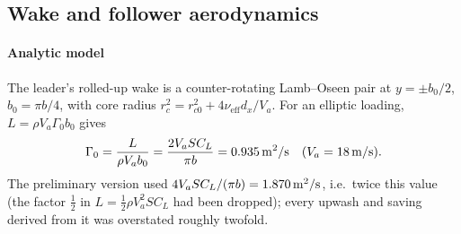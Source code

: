 \documentclass[preprint,12pt]{elsarticle}
\newcommand{\Va}{V_a}
\begin{document}
\begin{table}[H]
\centering\small
\caption{Parameters. M: from the preliminary manuscript (unverified); D: derived; A: assumption introduced here. All A-values need measurement before any quantitative claim is transferred to hardware.}\label{tab:params}
\end{table}



\subsection{Wake and follower aerodynamics}\label{sec:wake}
\paragraph{Analytic model} The leader's rolled-up wake is a counter-rotating Lamb--Oseen pair \cite{lamb1932} at $y=\pm b_0/2$, $b_0=\pi b/4$, with core radius $r_c^2=r_{c0}^2+4\nu_{\mathrm{eff}}d_x/\Va$. For an elliptic loading, $L=\rho\Va\Gamma_0 b_0$ gives
\begin{equation}
\Gamma_0=\frac{L}{\rho\Va b_0}=\frac{2\Va S C_L}{\pi b}=\SI{\ngammaTrue}{m^2/s}\quad(\Va=\SI{18}{m/s}).
\end{equation}
The preliminary version used $4\Va SC_L/(\pi b)=\SI{\ngammaPub}{m^2/s}$, i.e.\ twice this value (the factor $\tfrac12$ in $L=\tfrac12\rho\Va^2SC_L$ had been dropped); every upwash and saving derived from it was overstated roughly twofold.
\end{document}

